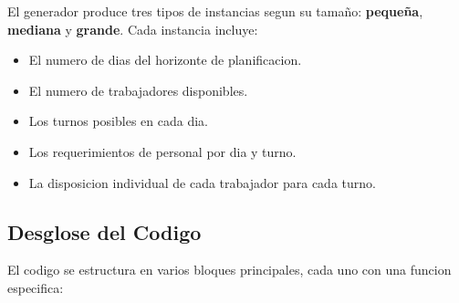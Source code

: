 \documentclass{article}
\begin{document}
El generador produce tres tipos de instancias segun su tamaño: \textbf{pequeña}, \textbf{mediana} y \textbf{grande}. Cada instancia incluye:
\begin{itemize}
    \item El numero de dias del horizonte de planificacion.
    \item El numero de trabajadores disponibles.
    \item Los turnos posibles en cada dia.
    \item Los requerimientos de personal por dia y turno.
    \item La disposicion individual de cada trabajador para cada turno.
\end{itemize}

\subsection*{Desglose del Codigo}
El codigo se estructura en varios bloques principales, cada uno con una funcion especifica:
\end{document}
